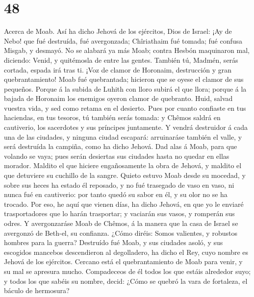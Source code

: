 \hypertarget{section-47}{%
\section{48}\label{section-47}}

 Acerca de Moab. Así ha dicho Jehová de los ejércitos,
Dios de Israel: ¡Ay de Nebo! que fué destruída, fué avergonzada;
Chîriathaim fué tomada; fué confusa Misgab, y desmayó.  No
se alabará ya más Moab; contra Hesbón maquinaron mal, diciendo: Venid, y
quitémosla de entre las gentes. También tú, Madmén, serás cortada,
espada irá tras ti.  ¡Voz de clamor de Horonaim,
destrucción y gran quebrantamiento!  Moab fué quebrantada;
hicieron que se oyese el clamor de sus pequeños.  Porque á
la subida de Luhith con lloro subirá el que llora; porque á la bajada de
Horonaim los enemigos oyeron clamor de quebranto.  Huid,
salvad vuestra vida, y sed como retama en el desierto. 
Pues por cuanto confiaste en tus haciendas, en tus tesoros, tú también
serás tomada: y Chêmos saldrá en cautiverio, los sacerdotes y sus
príncipes juntamente.  Y vendrá destruidor á cada una de
las ciudades, y ninguna ciudad escapará: arruinaráse también el valle, y
será destruída la campiña, como ha dicho Jehová.  Dad alas
á Moab, para que volando se vaya; pues serán desiertas sus ciudades
hasta no quedar en ellas morador.  Maldito el que hiciere
engañosamente la obra de Jehová, y maldito el que detuviere su cuchillo
de la sangre.  Quieto estuvo Moab desde su mocedad, y
sobre sus heces ha estado él reposado, y no fué trasegado de vaso en
vaso, ni nunca fué en cautiverio: por tanto quedó su sabor en él, y su
olor no se ha trocado.  Por eso, he aquí que vienen días,
ha dicho Jehová, en que yo le enviaré trasportadores que lo harán
trasportar; y vaciarán sus vasos, y romperán sus odres. 
Y avergonzaráse Moab de Chêmos, á la manera que la casa de Israel se
avergonzó de Beth-el, su confianza.  ¿Cómo diréis: Somos
valientes, y robustos hombres para la guerra?  Destruído
fué Moab, y sus ciudades asoló, y sus escogidos mancebos descendieron al
degolladero, ha dicho el Rey, cuyo nombre es Jehová de los ejércitos.
 Cercano está el quebrantamiento de Moab para venir, y su
mal se apresura mucho.  Compadeceos de él todos los que
estáis alrededor suyo; y todos los que sabéis su nombre, decid: ¿Cómo se
quebró la vara de fortaleza, el báculo de hermosura? 
